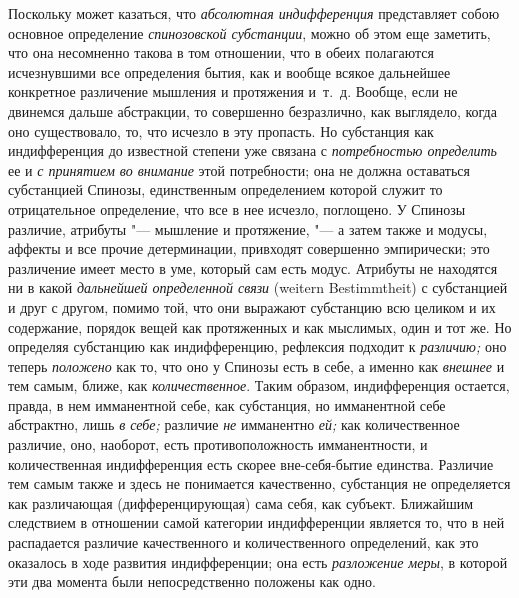 Поскольку может казаться, что {\em абсолютная
индифференция} представляет собою основное определение
{\em спинозовской субстанции}, можно об этом еще
заметить, что она несомненно такова в том отношении, что в обеих полагаются
исчезнувшими все определения бытия, как и вообще всякое дальнейшее
конкретное различение мышления и протяжения и~т.~д. Вообще, если не
двинемся дальше абстракции, то совершенно безразлично, как выглядело, когда
оно существовало, то, что исчезло в эту пропасть. Но субстанция как
индифференция до известной степени уже связана с
{\em потребностью определить} ее и
{\em с принятием во внимание} этой потребности; она не
должна оставаться субстанцией Спинозы, единственным определением которой
служит то отрицательное определение, что все в нее исчезло,
поглощено.
У Спинозы различие, атрибуты "--- мышление и протяжение, "--- а затем также и
модусы, аффекты и все прочие детерминации, привходят совершенно
эмпирически; это различение имеет место в уме, который сам есть модус.
Атрибуты не находятся ни в какой {\em дальнейшей
определенной связи} (weitern Bestimmtheit) с субстанцией и друг с другом,
помимо той, что они выражают субстанцию всю целиком и их содержание,
порядок вещей как протяженных и как мыслимых, один и тот же. Но определяя
субстанцию как индифференцию, рефлексия подходит к {\em различию;} оно теперь
{\em положено} как то, что оно у Спинозы есть в себе, а
именно как {\em внешнее} и тем самым, ближе, как
{\em количественное}. Таким образом, индифференция
остается, правда, в нем имманентной себе, как субстанция, но имманентной
себе абстрактно, лишь {\em в себе;} различие
{\em не} имманентно {\em ей;} как
количественное различие, оно, наоборот, есть противоположность
имманентности, и количественная индифференция есть скорее вне-себя-бытие
единства. Различие тем самым также и здесь не понимается качественно,
субстанция не определяется как различающая (дифференцирующая) сама себя, как
субъект. Ближайшим следствием в отношении самой категории индифференции
является то, что в ней распадается различие качественного и количественного
определений, как это оказалось в ходе развития индифференции; она есть
{\em разложение меры}, в которой эти два момента были
непосредственно положены как одно.

